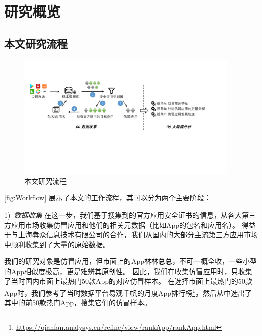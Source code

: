 \chapter{研究概览}
\label{chp:dataCollection}

\section{本文研究流程}

\begin{figure}[htbp]
	\centering
	\includegraphics[width=0.95\textwidth]{./Figures/overview_modified.pdf}
	\caption{本文研究流程}
	\label{fig:Workflow}
	\vspace{-3mm}
\end{figure}

\autoref{fig:Workflow} 展示了本文的工作流程，其可以分为两个主要阶段：

1)\ \emph{数据收集} \quad
在这一步，我们基于搜集到的官方应用安全证书的信息，从各大第三方应用市场收集仿冒应用和他们的相关元数据（比如App的包名和应用名）。
得益于与上海犇众信息技术有限公司的合作，我们从国内的大部分主流第三方应用市场中顺利收集到了大量的原始数据。

我们的研究对象是仿冒应用，但市面上的App林林总总，不可一概全收，一些小型的App相似度极高，更是难辨其原创性。
因此，我们在收集仿冒应用时，只收集了当时国内市面上最热门50款App的对应仿冒样本。
在选择市面上最热门的50款App时，我们参考了当时数据平台易观千帆的月度App排行榜\footnote{\url{https://qianfan.analysys.cn/refine/view/rankApp/rankApp.html}}，然后从中选出了其中的前50款热门App，搜集它们的仿冒样本。

